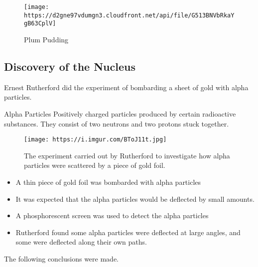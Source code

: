 \begin{figure}
\centering
\texttt{[image: https://d2gne97vdumgn3.cloudfront.net/api/file/G513BNVbRkaYgB63CplV]}
\caption{Plum Pudding}
\end{figure}

\hypertarget{discovery-of-the-nucleus}{%
\subsection{Discovery of the Nucleus}\label{discovery-of-the-nucleus}}

Ernest Rutherford did the experiment of bombarding a sheet of gold with
alpha particles.

\begin{definition}{Alpha Particles}
Positively charged particles produced by certain radioactive substances.
They consist of two neutrons and two protons stuck together.
\end{definition}

\begin{figure}
\centering
\texttt{[image: https://i.imgur.com/BToJ11t.jpg]}
\caption{The experiment carried out by Rutherford to investigate how
alpha particles were scattered by a piece of gold foil.}
\end{figure}

\begin{itemize}
\tightlist
\item
  A thin piece of gold foil was bombarded with alpha particles
\item
  It was expected that the alpha particles would be deflected by small
  amounts.
\item
  A phosphorescent screen was used to detect the alpha particles
\item
  Rutherford found some alpha particles were deflected at large angles,
  and some were deflected along their own paths.
\end{itemize}

The following conclusions were made.

